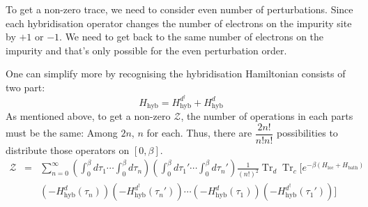\documentclass[a4paper]{article}
\DeclareMathOperator{\Tr}{Tr}
\begin{document}
To get a non-zero trace, we need to consider even number of perturbations. Since
each hybridisation operator changes the number of electrons on the impurity site
by $+1$ or $-1$. We need to get back to the same number of electrons on the
impurity and that's only possible for the even perturbation order.

One can simplify more by recognising the hybridisation Hamiltonian consists of 
two part:
\begin{equation}
    H_{\text{hyb}} = H_{\text{hyb}}^{d^{\dagger}} + H_{\text{hyb}}^{d}
\end{equation}
As mentioned above, to get a non-zero $\mathcal{Z}$, the number of operations
in each parts must be the same: Among $2n$, $n$ for each. Thus, there are
$\dfrac{2n!}{n!n!}$ possibilities to distribute those operators on $[0,\beta]$.
\begin{eqnarray}
    \mathcal{Z} 
        &=& \sum_{n=0}^{\infty} 
            \left(
                \int_{0}^{\beta}d\tau_{1} \cdots \int_{0}^{\beta}d\tau_{n}
            \right)
            \left(
                \int_{0}^{\beta}d\tau_{1}' \cdots \int_{0}^{\beta}d\tau_{n}'
            \right)
            \frac{1}{(n!)^2} \Tr_{d}\Tr_{c} \Bigg[
                e^{-\beta(H_{\text{loc}} + H_{\text{bath}})} \\
        &&  (-H_{\text{hyb}}^{d}(\tau_{n}))
            (-H_{\text{hyb}}^{d^{\dagger}}(\tau_{n}'))
            \cdots
            (-H_{\text{hyb}}^{d}(\tau_{1}))
            (-H_{\text{hyb}}^{d^{\dagger}}(\tau_{1}'))
            \Bigg] \\
\end{eqnarray}
\end{document}
